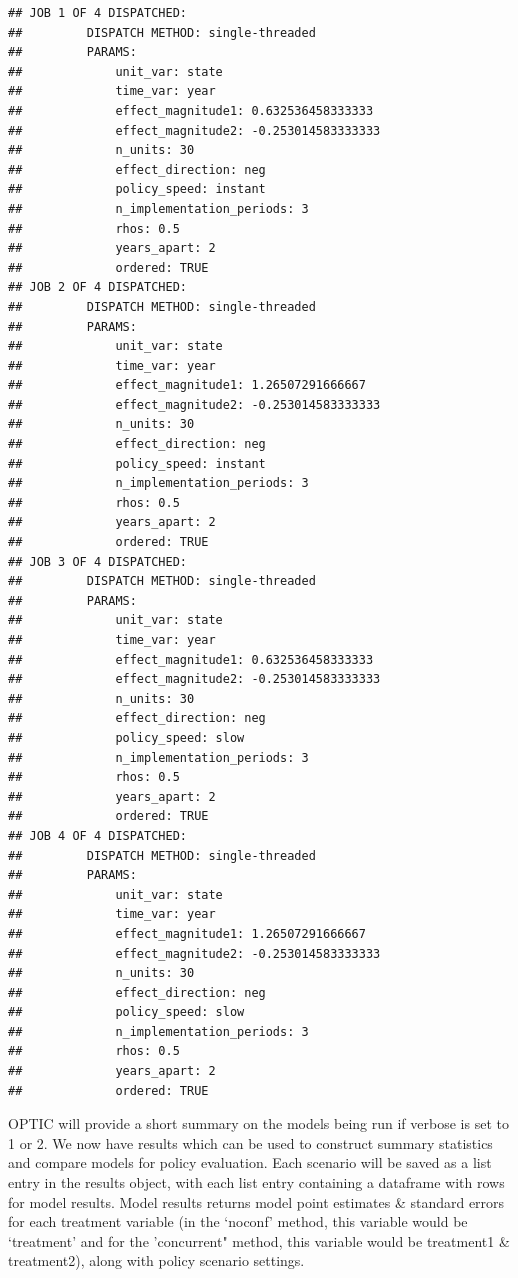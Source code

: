 \documentclass[
]{article}
\begin{document}
\begin{verbatim}
## JOB 1 OF 4 DISPATCHED:
##         DISPATCH METHOD: single-threaded
##         PARAMS:
##             unit_var: state
##             time_var: year
##             effect_magnitude1: 0.632536458333333
##             effect_magnitude2: -0.253014583333333
##             n_units: 30
##             effect_direction: neg
##             policy_speed: instant
##             n_implementation_periods: 3
##             rhos: 0.5
##             years_apart: 2
##             ordered: TRUE
## JOB 2 OF 4 DISPATCHED:
##         DISPATCH METHOD: single-threaded
##         PARAMS:
##             unit_var: state
##             time_var: year
##             effect_magnitude1: 1.26507291666667
##             effect_magnitude2: -0.253014583333333
##             n_units: 30
##             effect_direction: neg
##             policy_speed: instant
##             n_implementation_periods: 3
##             rhos: 0.5
##             years_apart: 2
##             ordered: TRUE
## JOB 3 OF 4 DISPATCHED:
##         DISPATCH METHOD: single-threaded
##         PARAMS:
##             unit_var: state
##             time_var: year
##             effect_magnitude1: 0.632536458333333
##             effect_magnitude2: -0.253014583333333
##             n_units: 30
##             effect_direction: neg
##             policy_speed: slow
##             n_implementation_periods: 3
##             rhos: 0.5
##             years_apart: 2
##             ordered: TRUE
## JOB 4 OF 4 DISPATCHED:
##         DISPATCH METHOD: single-threaded
##         PARAMS:
##             unit_var: state
##             time_var: year
##             effect_magnitude1: 1.26507291666667
##             effect_magnitude2: -0.253014583333333
##             n_units: 30
##             effect_direction: neg
##             policy_speed: slow
##             n_implementation_periods: 3
##             rhos: 0.5
##             years_apart: 2
##             ordered: TRUE
\end{verbatim}

OPTIC will provide a short summary on the models being run if verbose is
set to 1 or 2. We now have results which can be used to construct
summary statistics and compare models for policy evaluation. Each
scenario will be saved as a list entry in the results object, with each
list entry containing a dataframe with rows for model results. Model
results returns model point estimates \& standard errors for each
treatment variable (in the `noconf' method, this variable would be
`treatment' and for the 'concurrent" method, this variable would be
treatment1 \& treatment2), along with policy scenario settings.
\end{document}
